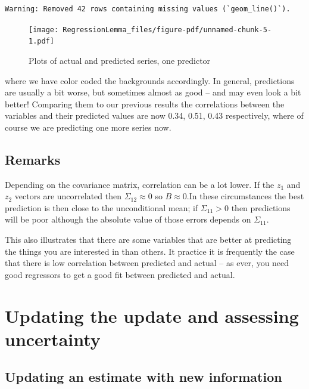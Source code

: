 \documentclass[
  letterpaper,
]{book}
\begin{document}
\begin{verbatim}
Warning: Removed 42 rows containing missing values (`geom_line()`).
\end{verbatim}

\begin{figure}[H]

{\centering \texttt{[image: RegressionLemma\_files/figure-pdf/unnamed-chunk-5-1.pdf]}

}

\caption{Plots of actual and predicted series, one predictor}

\end{figure}

where we have color coded the backgrounds accordingly. In general,
predictions are usually a bit worse, but sometimes almost as good -- and
may even look a bit better! Comparing them to our previous results the
correlations between the variables and their predicted values are now
0.34, 0.51, 0.43 respectively, where of course we are predicting one
more series now.

\hypertarget{remarks}{%
\subsection{Remarks}\label{remarks}}

Depending on the covariance matrix, correlation can be a lot lower. If
the \(z_1\) and \(z_2\) vectors are uncorrelated then
\(\Sigma_{12}\approx 0\) so \(B\approx 0\).In these circumstances the
best prediction is then close to the unconditional mean; if
\(\Sigma_{11}>0\) then predictions will be poor although the absolute
value of those errors depends on \(\Sigma_{11}\).

This also illustrates that there are some variables that are better at
predicting the things you are interested in than others. It practice it
is frequently the case that there is low correlation between predicted
and actual -- as ever, you need good regressors to get a good fit
between predicted and actual.

\hypertarget{updating-the-update-and-assessing-uncertainty}{%
\section{Updating the update and assessing
uncertainty}\label{updating-the-update-and-assessing-uncertainty}}

\hypertarget{updating-an-estimate-with-new-information}{%
\subsection{Updating an estimate with new
information}\label{updating-an-estimate-with-new-information}}
\end{document}
